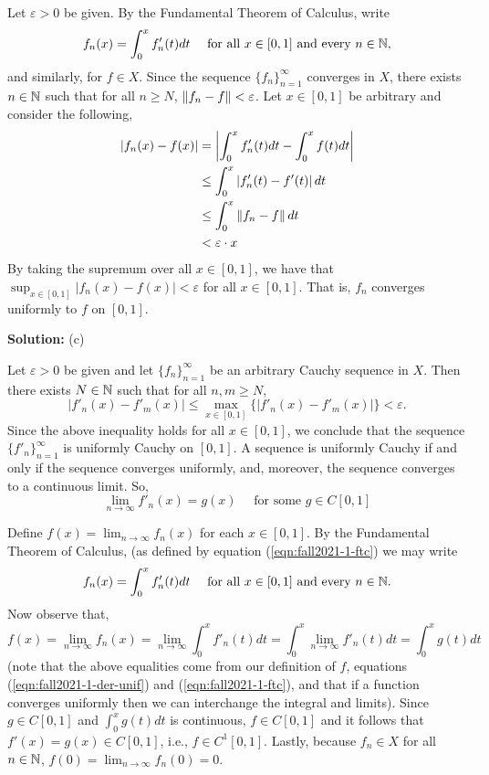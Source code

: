 \documentclass{article}
\begin{document}
Let $\varepsilon > 0$ be given. By the Fundamental Theorem of Calculus, write 
	\begin{equation}\label{eqn:fall2021-1-ftc}
	 	f_n(x) = \int_0^x f'_n(t) dt \quad \text{ for all } x\in [0,1] \text{ and every } n\in \mathbb N,
	 \end{equation}
and similarly, for $f\in X$. Since the sequence $\{f_n\}_{n=1}^\infty$ converges in $X$, there exists $n\in \mathbb N$ 
such that for all $n\geq N$, $\left\lVert {f_n - f} \right\rVert<\varepsilon$. Let $x\in[0,1]$ be arbitrary and consider the following, 
	\begin{align*}
		|f_n(x) - f(x)| & = \left| \int_0^x f'_n(t) dt - \int_0^x f(t) dt \right|\\
				    & \leq \int_0^x \left| f'_n(t) - f'(t) \right| dt\\
				    & \leq \int_0^x \left\lVert {f_n - f} \right\rVert dt\\
				    & < \varepsilon \cdot x
	\end{align*}
By taking the supremum over all $x\in [0,1]$, we have that $\sup_{x\in [0,1]} |f_n(x) - f(x)| < \varepsilon$ for all $x\in [0,1]$.
That is, $f_n$ converges uniformly to $f$ on $[0,1]$.

\textbf{Solution:} (c)

Let $\varepsilon > 0$ be given and let $\{ f_n \}_{n=1}^\infty$ be an arbitrary Cauchy sequence in $X$. 
Then there exists $N\in \mathbb N$ such that for all $n,m\geq N$,
	\[ | f'_n(x) - f'_m(x) | \leq \max_{x\in [0,1]}\{| f'_n(x) - f'_m(x) |\} < \varepsilon. \]
Since the above inequality holds for all $x\in [0,1]$, we conclude that the sequence $\{ f'_n\}_{n=1}^\infty$ is uniformly
Cauchy on $[0,1]$. A sequence is uniformly Cauchy if and only if the sequence converges uniformly, and, moreover, 
the sequence converges to a continuous limit. So, 
	\begin{equation}\label{eqn:fall2021-1-der-unif}
		 \lim_{n\to \infty} f'_n(x) = g(x) \quad \text{ for some } g \in C[0,1]
	\end{equation}

Define $f(x) = \lim_{n\to\infty}f_n(x)$ for each $x\in[0,1]$. By the Fundamental Theorem of Calculus, (as defined by equation (\ref{eqn:fall2021-1-ftc}) we may write 
	\begin{equation*}
	 f_n(x) = \int_0^x f'_n(t) dt \quad \text{ for all } x\in [0,1] \text{ and every } n\in \mathbb N.
	 \end{equation*}
Now observe that,
	\[f(x) = \lim_{n \to \infty} f_n(x) = \lim_{n \to \infty} \int_0^x f'_n(t) dt = \int_0^x \lim_{n\to \infty} f'_n(t) dt = \int_0^x g(t) dt\]
(note that the above equalities come from our definition of $f$, equations (\ref{eqn:fall2021-1-der-unif}) and 
(\ref{eqn:fall2021-1-ftc}), and that if a function converges uniformly then we can interchange the integral and limits). 
Since $g\in C[0,1]$ and $\int_0^x g(t) dt$ is continuous, $f\in C[0,1]$ and it follows that $f'(x) = g(x) \in C[0,1]$, i.e.,
 $f\in C^1[0,1]$. Lastly, because $f_n\in X$ for all $n\in \mathbb N$, $f(0) = \lim_{n\to\infty} f_n(0) = 0$. 
\end{document}
